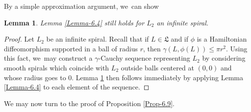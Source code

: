 \documentclass[JEP,XML,SOM,Unicode,NoFloatCountersInSection,published]{cedram}
\newtheorem{lem}[thm]{Lemma}
\theoremstyle{definition}
\newcommand{\fL}{\mathfrak {L}}
\begin{document}
By a simple approximation argument, we~can show
\begin{lem} \label{Lemma-6.4-for-infinite-spirals} Lemma \ref{Lemma-6.4} still holds for $L_2$ an infinite spiral.
\end{lem}

\begin{proof} Let $L_2$ be an infinite spiral. Recall that if $L\in\fL$ and if $\phi$ is a Hamiltonian diffeomorphism supported in a ball of radius $r$, then $\gamma(L, \phi(L))\leq \pi r^2$. Using this fact, we~may construct a $\gamma$\nobreakdash-Cauchy sequence representing $L_2$ by considering smooth spirals which coincide with $L_2$ outside balls centered at $(0,0)$ and whose radius goes to $0$. Lemma \ref{Lemma-6.4-for-infinite-spirals} then follows immediately by applying Lemma \ref{Lemma-6.4} to each element of the sequence.
\end{proof}

We may now turn to the proof of Proposition \ref{Prop-6.9}.
\end{document}

